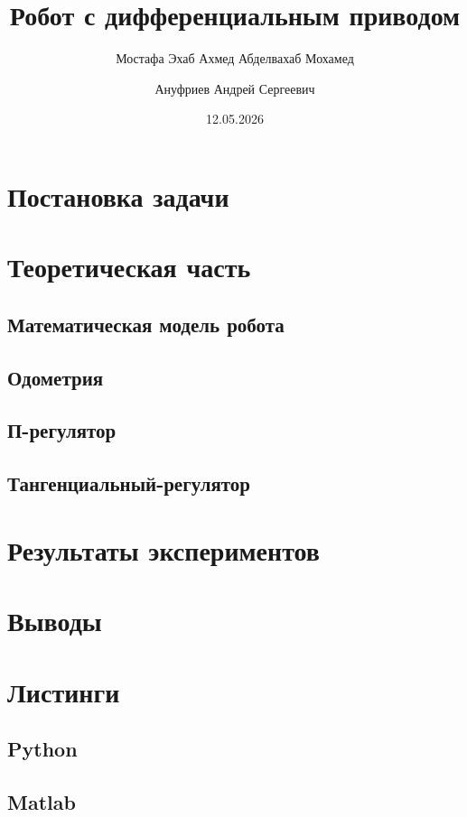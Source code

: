 \documentclass[a4paper, 12pt]{article}
\title{
Робот с дифференциальным приводом
}
\author{Мостафа Эхаб Ахмед Абделвахаб Мохамед}
\affil{503341}
\author{Ануфриев Андрей Сергеевич}
\affil{465029}
\date{12.05.2026}
\begin{document}
    \maketitle
    \section{Постановка задачи}
    \section{Теоретическая часть}
        \subsection{Математическая модель робота}
        \subsection{Одометрия}
        \subsection{П-регулятор}
        \subsection{Тангенциальный-регулятор}

    \section{Результаты экспериментов}
    \section{Выводы}
    \section{Листинги}
        \subsection{Python}
        \subsection{Matlab}
\end{document}
